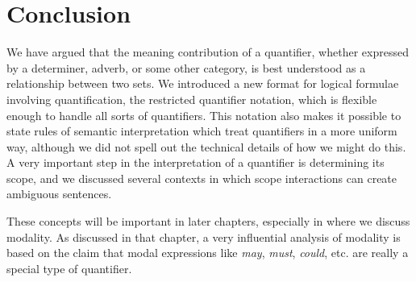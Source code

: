 {\section{Conclusion}\label{sec:14.6}\largerpage

We have argued that the meaning contribution of a quantifier, whether expressed by a determiner, adverb, or some other category, is best understood as a relationship between two sets. We introduced a new format for logical formulae involving quantification, the restricted quantifier notation, which is flexible enough to handle all sorts of quantifiers. This notation also makes it possible to state rules of semantic interpretation which treat quantifiers in a more uniform way, although we did not spell out the technical details of how we might do this. A very important step in the interpretation of a quantifier is determining its scope, and we discussed several contexts in which scope interactions can create ambiguous sentences.



These concepts will be important in later chapters, especially in  where we discuss modality. As discussed in that chapter, a very influential analysis of modality is based on the claim that modal expressions like \textit{may}, \textit{must}, \textit{could}, etc. are really a special type of quantifier.\largerpage



}
